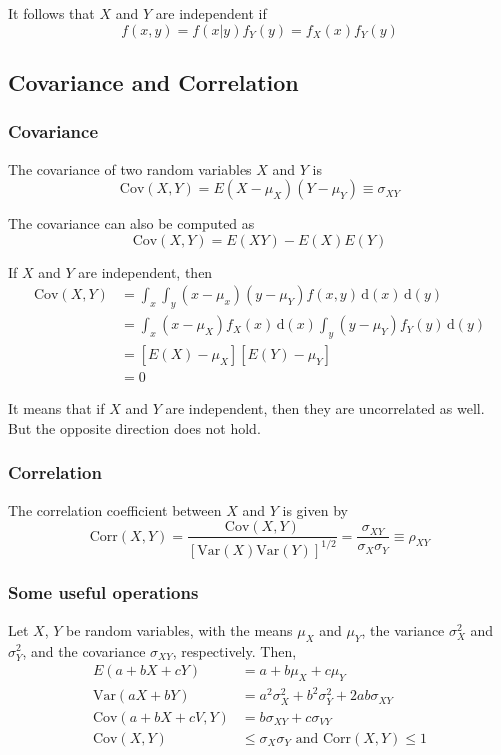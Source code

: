 \documentclass[a4paper,11pt]{article}
\newcommand{\dx}{\mathrm{d}}
\newcommand{\var}{\mathrm{Var}}
\newcommand{\cov}{\mathrm{Cov}}
\newcommand{\corr}{\mathrm{Corr}}
\begin{document}
It follows that \(X\) and \(Y\) are independent if
\[ f(x, y) = f(x|y)f_{Y}(y) = f_{X}(x)f_{Y}(y) \]

\subsection{Covariance and Correlation}
\label{sec:org9f523d7}
\subsubsection*{Covariance}
\label{sec:org765c642}
The covariance of two random variables \(X\) and \(Y\) is
\[ \cov(X, Y) = E(X-\mu_{X})(Y-\mu_{Y}) \equiv \sigma_{XY} \]

The covariance can also be computed as
\[ \cov(X, Y) = E(XY) - E(X)E(Y) \]

If \(X\) and \(Y\) are independent, then
\begin{align*}
\cov(X, Y) & = \int_{x}\int_{y}(x - \mu_{x})(y - \mu_{Y})f(x, y)\, \dx(x)\, \dx(y) \\
& = \int_{x} (x - \mu_{X})f_{X}(x)\, \dx(x) \int_{y}(y - \mu_{Y})f_{Y}(y)\, \dx(y) \\
& = \left[E(X) - \mu_{X} \right] \left[ E(Y) - \mu_{Y} \right] \\
& = 0
\end{align*}

It means that if \(X\) and \(Y\) are independent, then they are
uncorrelated as well. But the opposite direction does not hold.

\subsubsection*{Correlation}
\label{sec:org3bcfb51}
The correlation coefficient between \(X\) and \(Y\) is given by
\[
\corr(X, Y) = \frac{\cov(X, Y)}{\left[\var(X)\var(Y)\right]^{1/2}} =
\frac{\sigma_{XY}}{\sigma_{X}\sigma_{Y}} \equiv \rho_{XY}
\]

\subsubsection*{Some useful operations}
\label{sec:org48b1892}
Let \(X\), \(Y\) be random variables, with the means \(\mu_{X}\) and
\(\mu_{Y}\), the variance \(\sigma^{2}_{X}\) and \(\sigma^{2}_{Y}\), and the
covariance \(\sigma_{XY}\), respectively. Then,
\begin{align*}
E(a + bX + cY) & = a + b \mu_{X} + c \mu_{Y} \\
\var(aX + bY)  & = a^{2} \sigma^{2}_{X} + b^{2} \sigma^{2}_{Y} + 2ab\sigma_{XY} \\
\cov(a + bX + cV, Y) & = b\sigma_{XY} + c\sigma_{VY} \\
\cov(X, Y) & \leq \sigma_{X}\sigma_{Y} \text{ and }  \corr(X, Y) \leq 1
\end{align*}
\end{document}
